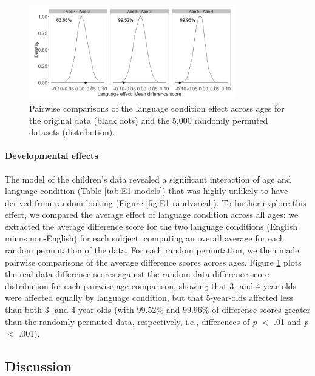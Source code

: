 \documentclass[authoryear, 12pt]{elsarticle}
\begin{document}
\begin{figure}[h!]
\begin{center}
\includegraphics[width=0.8\textwidth]{figures/E1-child-randvsreal-ttest-agebylg.png}
\end{center}
\caption{Pairwise comparisons of the language condition effect across ages for the original data (black dots) and the 5,000 randomly permuted datasets (distribution).} 
\label{fig:E1-lgageinteraction}
\end{figure}

\paragraph{Developmental effects}
The model of the children's data revealed a significant interaction of age and language condition (Table \ref{tab:E1-models}) that was highly unlikely to have derived from random looking (Figure \ref{fig:E1-randvsreal}). To further explore this effect, we compared the average effect of language condition across all ages: we extracted the average difference score for the two language conditions (English minus non-English) for each subject, computing an overall average for each random permutation of the data. For each random permutation, we then made pairwise comparisons of the average difference scores across ages. Figure \ref{fig:E1-lgageinteraction} plots the real-data difference scores against the random-data difference score distribution for each pairwise age comparison, showing that 3- and 4-year olds were affected equally by language condition, but that 5-year-olds affected less than both 3- and 4-year-olds (with 99.52\% and 99.96\% of difference scores greater than the randomly permuted data, respectively, i.e., differences of \textit{p} $<$ .01 and \textit{p} $<$ .001).

\subsection{Discussion}
\label{sec:discussion1}
\end{document}
